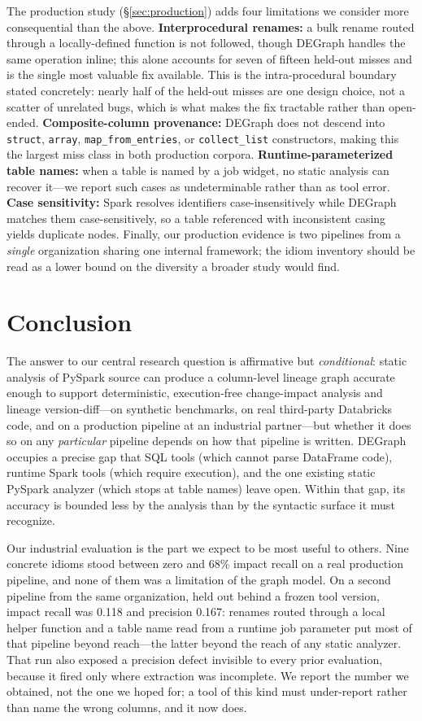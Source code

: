 \documentclass[11pt]{article}
\newcommand{\code}[1]{\texttt{#1}}
\begin{document}
The production study (\S\ref{sec:production}) adds four limitations we consider more
consequential than the above. \textbf{Interprocedural renames:} a bulk rename routed
through a locally-defined function is not followed, though DEGraph handles the same
operation inline; this alone accounts for seven of fifteen held-out misses and is the
single most valuable fix available. This is the intra-procedural boundary stated concretely:
nearly half of the held-out misses are one design choice, not a scatter of unrelated bugs,
which is what makes the fix tractable rather than open-ended. \textbf{Composite-column provenance:} DEGraph
does not descend into \code{struct}, \code{array}, \code{map\_from\_entries}, or
\code{collect\_list} constructors, making this the largest miss class in both
production corpora. \textbf{Runtime-parameterized table names:} when a table is named
by a job widget, no static analysis can recover it---we report such cases as
undeterminable rather than as tool error. \textbf{Case sensitivity:} Spark resolves
identifiers case-insensitively while DEGraph matches them case-sensitively, so a
table referenced with inconsistent casing yields duplicate nodes. Finally, our
production evidence is two pipelines from a \emph{single} organization sharing one
internal framework; the idiom inventory should be read as a lower bound on the
diversity a broader study would find.

\section{Conclusion}
The answer to our central research question is affirmative but \emph{conditional}:
static analysis of PySpark source can produce a column-level lineage graph accurate
enough to support deterministic, execution-free change-impact analysis and lineage
version-diff---on synthetic benchmarks, on real third-party Databricks code, and on a
production pipeline at an industrial partner---but whether it does so on any \emph{particular}
pipeline depends on how that pipeline is written. DEGraph occupies a precise gap
that SQL tools (which cannot parse DataFrame code), runtime Spark tools (which
require execution), and the one existing static PySpark analyzer (which stops at
table names) leave open. Within that gap, its accuracy is bounded less by the
analysis than by the syntactic surface it must recognize.

Our industrial evaluation is the part we expect to be most useful to others. Nine
concrete idioms stood between zero and 68\% impact recall on a real production pipeline,
and none of them was a limitation of the graph model. On a second pipeline from the
same organization, held out behind a frozen tool version, impact recall was 0.118 and
precision 0.167: renames routed through a local helper function and a table name read
from a runtime job parameter put most of that pipeline beyond reach---the latter
beyond the reach of any static analyzer. That run also exposed a precision defect
invisible to every prior evaluation, because it fired only where extraction was
incomplete. We report the number we obtained, not the one we hoped for; a tool of
this kind must under-report rather than name the wrong columns, and it now does.
\end{document}
